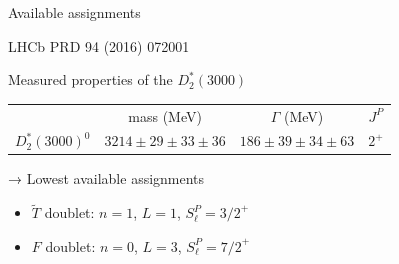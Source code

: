\documentclass[professionalfonts,aspectratio=169]{beamer}
\begin{document}
\begin{frame}{Available assignments}
  \begin{flushright}
    \footnotesize
    LHCb PRD 94 (2016) 072001
  \end{flushright}
 
  \begin{block}{Measured properties of the $D^*_2(3000)$}
    \begin{table}
      \small
      \centering
      \begin{tabular}{c c c c}
        \toprule
         & mass (MeV) & $\Gamma$ (MeV) & $J^P$ \\ 
        \cmidrule{2-4}
        $D^*_2(3000)^0$    & $3214   \pm 29  \pm 33  \pm 36$   & $186   \pm 39  \pm 34  \pm 63$   & \alert{$2^+$} \\
        \bottomrule
      \end{tabular}
    \end{table}
  \end{block}

  \begin{block}{→ Lowest available assignments}
    \begin{itemize}
      \item
        \(\tilde{T}\) doublet: \(n = 1\), \(L = 1\),
        \(S^P_\ell = \left. 3 / 2 \right.^+\)
      \item
        \(F\) doublet: \(n = 0\), \(L = 3\),
        \(S^P_\ell = \left. 7 / 2 \right.^+\)
    \end{itemize}
  \end{block}
\end{frame}
\end{document}
